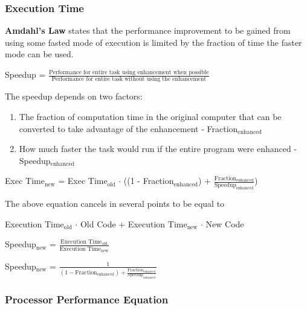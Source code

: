 \documentclass[11pt]{article}
\begin{document}
\subsubsection{Execution Time}

\textbf{Amdahl's Law} states that the performance improvement to be gained from using some fasted mode of execution is limited by the fraction of time the faster mode can be used.

\begin{center}
    Speedup = $\frac{\text{Performance for entire task using enhancement when possible}}{\text{Performance for entire task without using the enhancement}}$
\end{center}

The speedup depends on two factors:

\begin{enumerate}
    \item The fraction of computation time in the original computer that can be converted to take advantage of the enhancement - Fraction$_{\text{enhanced}}$
    \item How much faster the task would run if the entire program were enhanced - Speedup$_{\text{enhanced}}$
\end{enumerate}

\begin{center}
    {Exec Time}$_\text{new}$ = {Exec Time}$_\text{old}$ $\cdot$ ((1 - Fraction$_\text{enhanced}$) + $\frac{\text{Fraction}_\text{enhanced}}{\text{Speedup}_\text{enhanced}}$)
\end{center}

The above equation cancels in several points to be equal to 

\begin{center}
    Execution Time$_\text{old}$ $\cdot$ Old Code + Execution Time$_\text{new}$ $\cdot$ New Code
\end{center}

\begin{center}
    {Speedup}$_\text{new}$ = $\frac{\text{Execution Time}_\text{old}}{\text{Execution Time}_\text{new}}$
\end{center}

\begin{center}
    {Speedup}$_\text{new}$ = $\frac{1}{(1-\text{Fraction}_\text{enhanced}) + \frac{\text{Fraction}_\text{enhanced}}{\text{Speedup}_\text{enhanced}}}$
\end{center}

\subsubsection{Processor Performance Equation}
\end{document}
